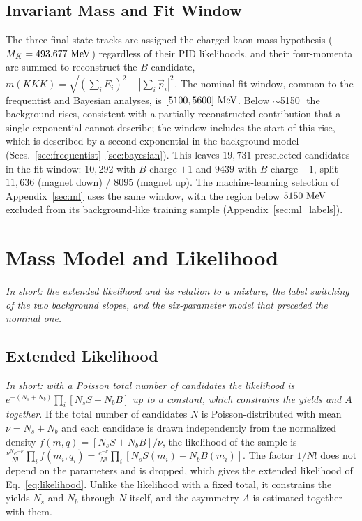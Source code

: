 \subsection{Invariant Mass and Fit Window}
The three final-state tracks are assigned the charged-kaon mass hypothesis ($M_K=493.677\,\,\text{Me\hspace{-.08em}V}$) regardless of their PID likelihoods, and their four-momenta are summed to reconstruct the $B$ candidate, $m(KKK)=\sqrt{(\sum_i E_i)^2-|\sum_i \vec{p}_i|^2}$. The nominal fit window, common to the frequentist and Bayesian analyses, is $[5100,5600]\,\,\text{Me\hspace{-.08em}V}$. Below $\sim$5150\,\MeV\ the background rises, consistent with a partially reconstructed contribution that a single exponential cannot describe; the window includes the start of this rise, which is described by a second exponential in the background model (Secs.~\ref{sec:frequentist}--\ref{sec:bayesian}). This leaves $19{,}731$ preselected candidates in the fit window: $10{,}292$ with $B$-charge $+1$ and $9439$ with $B$-charge $-1$, split $11{,}636$ (magnet down) / $8095$ (magnet up). The machine-learning selection of Appendix~\ref{sec:ml} uses the same window, with the region below $5150\,\,\text{Me\hspace{-.08em}V}$ excluded from its background-like training sample (Appendix~\ref{sec:ml_labels}).

\FloatBarrier

\section{Mass Model and Likelihood}
\label{app:model}
\emph{In short: the extended likelihood and its relation to a mixture, the label switching of the two background slopes, and the six-parameter model that preceded the nominal one.}

\subsection{Extended Likelihood}
\emph{In short: with a Poisson total number of candidates the likelihood is $e^{-(N_s+N_b)}\prod_i[N_s S+N_b B]$ up to a constant, which constrains the yields and $A$ together.}
If the total number of candidates $N$ is Poisson-distributed with mean $\nu=N_s+N_b$ and each candidate is drawn independently from the normalized density $f(m,q)=[N_s S+N_b B]/\nu$, the likelihood of the sample is $\frac{\nu^N e^{-\nu}}{N!}\prod_{i}f(m_i,q_i)=\frac{e^{-\nu}}{N!}\prod_i[N_s S(m_i)+N_b B(m_i)]$. The factor $1/N!$ does not depend on the parameters and is dropped, which gives the extended likelihood of Eq.~\eqref{eq:likelihood}. Unlike the likelihood with a fixed total, it constrains the yields $N_s$ and $N_b$ through $N$ itself, and the asymmetry $A$ is estimated together with them.

